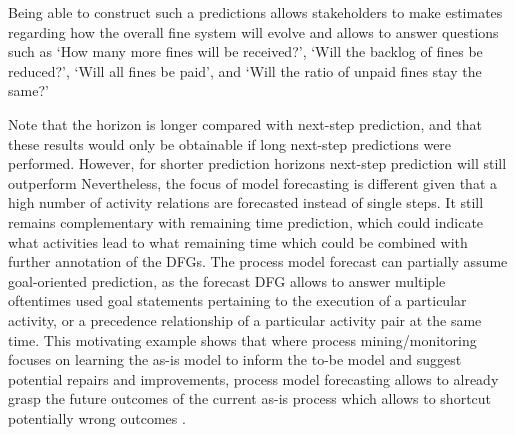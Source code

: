 Being able to construct such a predictions allows stakeholders to make estimates regarding how the overall fine system will evolve and allows to answer questions such as `How many more fines will be received?', `Will the backlog of fines be reduced?', `Will all fines be paid', and `Will the ratio of unpaid fines stay the same?'

Note that the horizon is longer compared with next-step prediction, and that these results would only be obtainable if long next-step predictions were performed.
However, for shorter prediction horizons next-step prediction will still outperform 
Nevertheless, the focus of model forecasting is different given that a high number of activity relations are forecasted instead of single steps.
It still remains complementary with remaining time prediction, which could indicate what activities lead to what remaining time which could be combined with further annotation of the DFGs.
The process model forecast can partially assume goal-oriented prediction, as the forecast DFG allows to answer multiple oftentimes used goal statements pertaining to the execution of a particular activity, or a precedence relationship of a particular activity pair \cite{DBLP:journals/tkdd/TeinemaaDRM19} at the same time.
This motivating example shows that where process mining/monitoring focuses on learning the as-is model to inform the to-be model and suggest potential repairs and improvements, process model forecasting allows to already grasp the future outcomes of the current as-is process which allows to shortcut potentially wrong outcomes \cite{DBLP:conf/bpm/PollPRRR18}.
